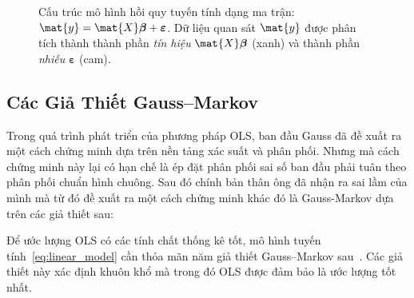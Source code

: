 \begin{figure}[H]
\centering
{}
\caption{Cấu trúc mô hình hồi quy tuyến tính dạng ma trận:
$\mat{y} = \mat{X}\boldsymbol{\beta} + \boldsymbol{\varepsilon}$.
Dữ liệu quan sát $\mat{y}$ được phân tích thành thành phần \textit{tín hiệu}
$\mat{X}\boldsymbol{\beta}$ (xanh) và thành phần \textit{nhiễu}
$\boldsymbol{\varepsilon}$ (cam).}
\label{fig:linear_model}
\end{figure}

\subsection{Các Giả Thiết Gauss–Markov}

Trong quá trình phát triển của phương pháp OLS, ban đầu Gauss đã đề xuất ra một cách chứng minh dựa trên nền tảng xác suất và phân phối. Nhưng mà cách chứng minh này lại có hạn chế là ép đặt phân phối sai số ban đầu phải tuân theo phân phối chuẩn hình chuông. Sau đó chính bản thân ông đã nhận ra sai lầm của mình mà từ đó đề xuất ra một cách chứng minh khác đó là Gauss-Markov dựa trên các giả thiết sau:

Để ước lượng OLS có các tính chất thống kê tốt, mô hình tuyến tính~\eqref{eq:linear_model}
cần thỏa mãn năm giả thiết Gauss--Markov sau~\cite{wooldridge2013,greene2012}. Các giả thiết này xác định khuôn khổ
mà trong đó OLS được đảm bảo là ước lượng tốt nhất.

